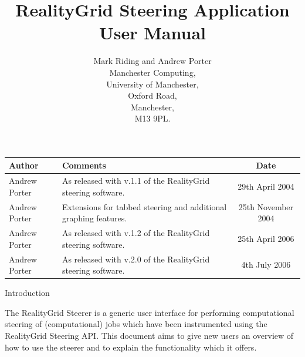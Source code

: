 \documentclass[a4paper,twoside]{article}
\begin{document}
\title{RealityGrid Steering Application User Manual}

\author{Mark Riding and Andrew Porter\\
Manchester Computing,\\University of Manchester,\\Oxford Road,\\
Manchester,\\M13 9PL.}

\maketitle

\begin{table}
\begin{center}
\begin{tabular}{l|p{5cm}|c}
\hline\hline
Author & Comments & Date \\
\hline
Andrew Porter & As released with v.1.1 of the RealityGrid steering software. & 29th April 2004 \\
Andrew Porter & Extensions for tabbed steering and additional graphing features. & 25th November 2004 \\
Andrew Porter & As released with v.1.2 of the RealityGrid steering software. & 25th April 2006\\
Andrew Porter & As released with v.2.0 of the RealityGrid steering software. & 4th July 2006\\
\hline\hline
\end{tabular}
\end{center}
\end{table}

\pagebreak

\tableofcontents

\pagebreak

\begin{section}{Introduction}

The RealityGrid Steerer is a generic user interface for performing
computational steering of (computational) jobs which have been
instrumented using the RealityGrid Steering API. This document aims to
give new users an overview of how to use the steerer and to explain
the functionality which it offers.

\end{section}

\end{document}
